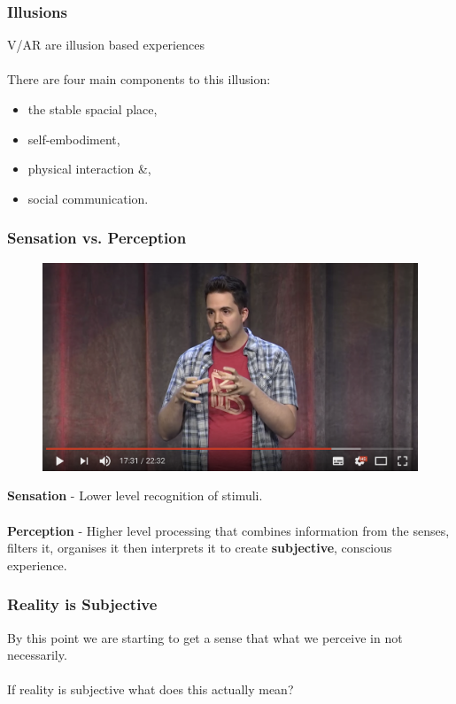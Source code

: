 \begin{frame}
	\frametitle{Illusions}
	V/AR are illusion based experiences \\~\\ 
	
	There are four main components to this illusion:
	\begin{itemize}
		\item the stable spacial place,
		\item self-embodiment,
		\item physical interaction \&,
		\item social communication.
	\end{itemize}
\end{frame}


\begin{frame}
	\frametitle{Sensation vs. Perception}	
	\begin{figure}
		\href{https://youtu.be/Ebwtq1HZJ2A?t=1051}{ \includegraphics[scale=.17]{assets/sensation}  }
	\end{figure}
	\textbf{Sensation} - Lower level recognition of stimuli. \\~\\
	\textbf{Perception} - Higher level processing that combines information from the senses, filters it, organises it then interprets it to create \textbf{subjective}, conscious experience. 
\end{frame}


\begin{frame}
	\frametitle{Reality is Subjective}
	By this point we are starting to get a sense that what we perceive in not necessarily. \\~\\ \pause
	If reality is subjective what does this actually mean?
\end{frame}

